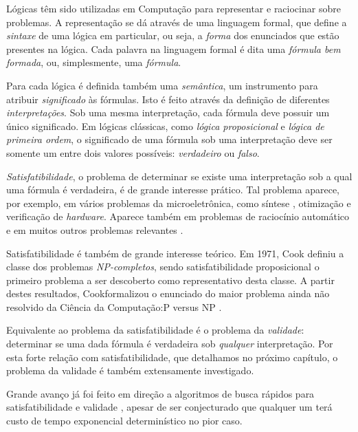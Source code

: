 \indent

Lógicas têm sido utilizadas em Computação para representar e raciocinar sobre problemas. A representação se dá através de uma linguagem formal, que define a \emph{sintaxe} de uma lógica em particular, ou seja, a \emph{forma} dos enunciados que estão presentes na lógica. Cada palavra na linguagem formal é dita uma \emph{fórmula bem formada}, ou, simplesmente, uma \emph{fórmula}.

Para cada lógica é definida também uma \emph{semântica}, um instrumento para atribuir \emph{significado} às fórmulas. Isto é feito através da definição de diferentes \emph{interpretações}. Sob uma mesma interpretação, cada fórmula deve possuir um único significado. Em lógicas clássicas, como \emph{lógica proposicional} e \emph{lógica de primeira ordem}, o significado de uma fórmula sob uma interpretação deve ser somente um entre dois valores possíveis: \emph{verdadeiro} ou \emph{falso}.

\emph{Satisfatibilidade}, o problema de determinar se existe uma interpretação sob a qual uma fórmula é verdadeira, é de grande interesse prático. Tal problema aparece, por exemplo, em vários problemas da microeletrônica, como síntese \cite{bloem2014sat}, otimização \cite{gupta2006sat} e verificação \cite{nieuwenhuis2006sat} de \textit{hardware}. Aparece também em problemas de raciocínio automático \cite{harrison2009handbook} e em muitos outros problemas relevantes \cite{horvitz1992automated}.

Satisfatibilidade é também de grande interesse teórico. Em 1971, Cook definiu a classe dos problemas \emph{NP-completos}, sendo satisfatibilidade proposicional o primeiro problema a ser descoberto como representativo desta classe. A partir destes resultados, Cook\break formalizou o enunciado do maior problema ainda não resolvido da Ciência da Computação:\break P versus NP \cite{cook1971complexity}.

Equivalente ao problema da satisfatibilidade é o problema da \emph{validade}: determinar se uma dada fórmula é verdadeira sob \emph{qualquer} interpretação. Por esta forte relação com satisfatibilidade, que detalhamos no próximo capítulo, o problema da validade é também extensamente investigado.

Grande avanço já foi feito em direção a algoritmos de busca rápidos para satisfatibilidade e validade \cite{davis1960computing,davis1962machine,biere2009conflict}, apesar de ser conjecturado que qualquer um terá custo de tempo exponencial determinístico no pior caso.

